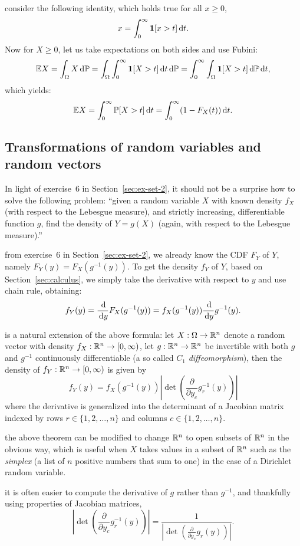 \documentclass{article}
\begin{document}
 consider the following identity, which holds true for all $x \ge 0$, 
\[ x = \int_0^\infty {\mathbf 1}[x > t] \,\mathrm{d} t. \]
Now for $X \ge 0$, let us take expectations on both sides and use Fubini:
\[ {\mathbb E} X = \int_\Omega X \,\mathrm{d} {\mathbb P} = \int_\Omega \int_0^\infty {\mathbf 1}[X > t] \,\mathrm{d} t \,\mathrm{d} {\mathbb P} =  \int_0^\infty \int_\Omega {\mathbf 1}[X > t] \,\mathrm{d} {\mathbb P}  \,\mathrm{d} t, \]
which yields:
\[ {\mathbb E} X = \int_0^\infty {\mathbb P}[X > t] \,\mathrm{d} t = \int_0^\infty (1 - F_X(t))  \,\mathrm{d} t. \]


\subsection{Transformations of random variables and random vectors}

 In light of exercise~6 in Section~\ref{sec:ex-set-2}, it should not be a surprise how to solve the following problem: ``given a random variable $X$ with known density $f_X$ (with respect to the Lebesgue measure), and strictly increasing, differentiable function $g$, find the density of $Y=g(X)$ (again, with respect to the Lebesgue measure).''

 from exercise~6 in Section~\ref{sec:ex-set-2}, we already know the CDF $F_Y$ of $Y$, namely $F_Y(y) = F_X(g^{-1}(y))$. To get the density $f_Y$ of $Y$, based on Section~\ref{sec:calculus}, we simply take the derivative with respect to $y$ and use chain rule, obtaining:
\[ f_Y(y) = \frac{\,\mathrm{d}}{\,\mathrm{d} y} F_X(g^{-1}(y)) = f_X(g^{-1}(y)) \frac{\,\mathrm{d}}{\,\mathrm{d} y} g^{-1}(y). \]

 is a natural extension of the above formula: let $X : \Omega \to {\mathbb R}^n$ denote a random vector with density $f_X : {\mathbb R}^n \to [0, \infty)$, let $g : {\mathbb R}^n \to {\mathbb R}^n$ be invertible with both $g$ and $g^{-1}$ continuously differentiable (a so called $C_1$ \emph{diffeomorphism}), then the density of $f_Y : {\mathbb R}^n \to [0, \infty)$ is given by
\[ f_Y(y) = f_X(g^{-1}(y)) \left| \det \left( \frac{\partial}{\partial y_c} g_r^{-1}(y) \right) \right| \]
where the derivative is generalized into the determinant of a Jacobian matrix indexed by rows $r \in \{1, 2, \dots, n\}$ and columns $c \in \{1, 2, \dots, n\}$. 

 the above theorem can be modified to change ${\mathbb R}^n$ to open subsets of ${\mathbb R}^n$ in the obvious way, which is useful when $X$ takes values in a subset of ${\mathbb R}^n$ such as the \emph{simplex} (a list of $n$ positive numbers that sum to one) in the case of a Dirichlet random variable. 

 it is often easier to compute the derivative of $g$ rather than $g^{-1}$, and thankfully using properties of Jacobian matrices,
\[  \left| \det \left( \frac{\partial}{\partial y_c} g_r^{-1}(y) \right) \right| = \frac{1}{\left| \det \left( \frac{\partial}{\partial y_c} g_r(y) \right) \right|}. \]
\end{document}
